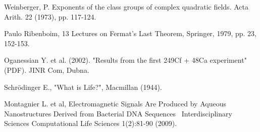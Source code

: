 \documentclass[a4paper,9pt]{article}
\begin{document}
\begin{thebibliography}{99}











 Weinberger, P. Exponents of the class groups of complex quadratic fields. Acta Arith. 22 (1973), pp. 117-124.



 Paulo Ribenboim, 13 Lectures on Fermat's Last Theorem, Springer, 1979, pp. 23, 152-153.

 Oganessian Y. et al. (2002). "Results from the first 249Cf + 48Ca experiment" (PDF). JINR Com, Dubna.

 Schrödinger E., "What is Life?", Macmillan (1944). 

 Montagnier L. et al, Electromagnetic Signals Are Produced by Aqueous Nanostructures Derived from Bacterial DNA Sequences  Interdisciplinary Sciences Computational Life Sciences 1(2):81-90 (2009).

 




\end{thebibliography}
\end{document}
